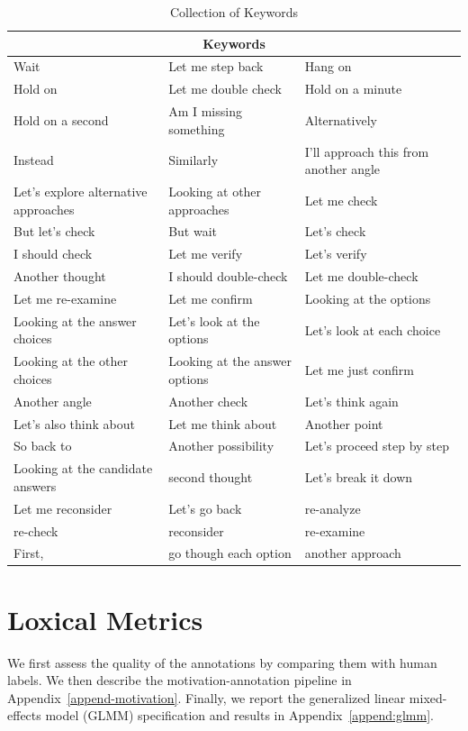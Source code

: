 \begin{table}[h]
\centering
\begin{tabular}{@{}p{4cm}p{4cm}p{4cm}@{}}
\toprule
\multicolumn{3}{c}{\textbf{Keywords}} \\
\midrule
Wait & Let me step back & Hang on \\
Hold on & Let me double check & Hold on a minute \\
Hold on a second & Am I missing something & Alternatively \\
Instead & Similarly & I'll approach this from another angle \\
Let's explore alternative approaches & Looking at other approaches & Let me check \\
But let's check & But wait & Let's check \\
I should check & Let me verify & Let's verify \\
Another thought & I should double-check & Let me double-check \\
Let me re-examine & Let me confirm & Looking at the options \\
Looking at the answer choices & Let's look at the options & Let's look at each choice \\
Looking at the other choices & Looking at the answer options & Let me just confirm \\
Another angle & Another check & Let's think again \\
Let's also think about & Let me think about & Another point \\
So back to & Another possibility & Let's proceed step by step\\
Looking at the candidate answers & second thought & Let’s break it down \\
Let me reconsider & Let's go back & re-analyze \\
re-check & reconsider & re-examine \\
First, & go though each option & another approach \\
\bottomrule
\end{tabular}
\caption{Collection of Keywords}
\label{app-tab1:keywords}
\end{table}

\section{Loxical Metrics}\label{appendix:loxical}

We first assess the quality of the \Review annotations by comparing them with human labels. We then describe the motivation-annotation pipeline in Appendix~\ref{append-motivation}. Finally, we report the generalized linear mixed-effects model (GLMM) specification and results in Appendix~\ref{append:glmm}.


